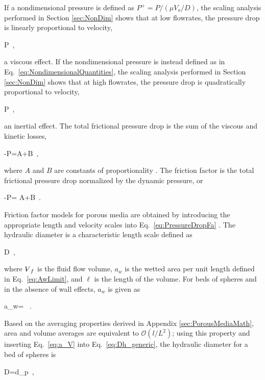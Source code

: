 If a nondimensional pressure is defined as \(P^+=P/(\mu V_o/D)\), the scaling analysis performed in Section \ref{sec:NonDim} shows that at low flowrates, the pressure drop is linearly proportional to velocity,

\beq
\label{eq:FrictionDragProportionality}
\nabla P\propto{}\ ,
\eeq

\noindent a viscous effect. If the nondimensional pressure is instead defined as in Eq.\ \eqref{eq:NondimensionalQuantities}, the scaling analysis performed in Section \ref{sec:NonDim} shows that at high flowrates, the pressure drop is quadratically proportional to velocity,

\beq
\label{eq:FormDragProportionality}
\nabla P\propto{}\ ,
\eeq

\noindent an inertial effect. The total frictional pressure drop is the sum of the viscous and kinetic losses,

\beq
\label{eq:TotalPressureDrop}
-\nabla P=A+B\ ,
\eeq

\noindent where \(A\) and \(B\) are constants of proportionality \cite{macdonald}. The friction factor is the total frictional pressure drop normalized by the dynamic pressure, or

\beq
\label{eq:PressureDropFa}
-\nabla P= A+B\ .
\eeq

\noindent Friction factor models for porous media are obtained by introducing the appropriate length and velocity scales into Eq.\ \eqref{eq:PressureDropFa} \cite{ergun}. The hydraulic diameter is a characteristic length scale defined as

\beq
\label{eq:Dh_generic}
D\equiv{}\ ,
\eeq

\noindent where \(\volume_f\) is the fluid flow volume, \(a_w\) is the wetted area per unit length defined in Eq.\ \eqref{eq:AwLimit}, and \(\ell\) is the length of the volume. For beds of spheres and in the absence of wall effects, \(a_w\) is given as \cite{achenbach}

\beq
\label{eq:a_V}
a_w= \ .
\eeq

\noindent Based on the averaging properties derived in Appendix \ref{sec:PorousMediaMath}, area and volume averages are equivalent to \(\mathcal{O}(l/L^2)\); using this property and inserting Eq.\ \eqref{eq:a_V} into Eq.\ \eqref{eq:Dh_generic}, the hydraulic diameter for a bed of spheres is

\beq
\label{eq:Dh}
D=d_p\ ,
\eeq

